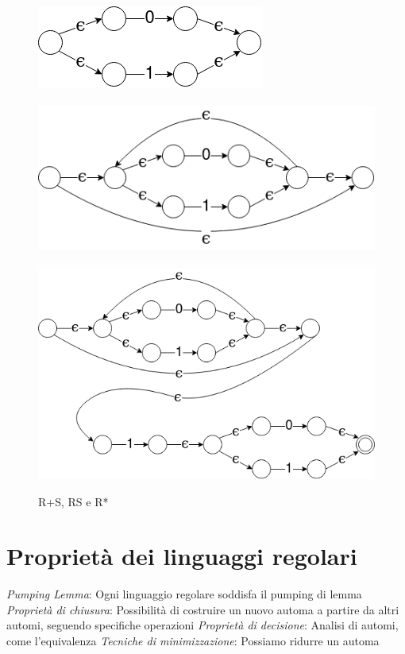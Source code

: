 \documentclass[12pt]{article}
\begin{document}
	\begin{figure}[ht]
		\includegraphics[scale = 0.4]{media/01.png} \\ \\
		\includegraphics[scale = 0.4]{media/01star.png} \\ \\
		\includegraphics[scale = 0.4]{media/01star01.png}
		\centering
		\caption{R+S, RS e R*}
	\end{figure}

	\section{Proprietà dei linguaggi regolari}
	\begin{outline}
		\1 \emph{Pumping Lemma}: Ogni linguaggio regolare soddisfa il pumping di lemma
		\1 \emph{Proprietà di chiusura}: Possibilità di costruire un nuovo automa a partire da altri automi, seguendo specifiche operazioni
		\1 \emph{Proprietà di decisione}: Analisi di automi, come l'equivalenza
		\1 \emph{Tecniche di minimizzazione}: Possiamo ridurre un automa
	\end{outline}
\end{document}
